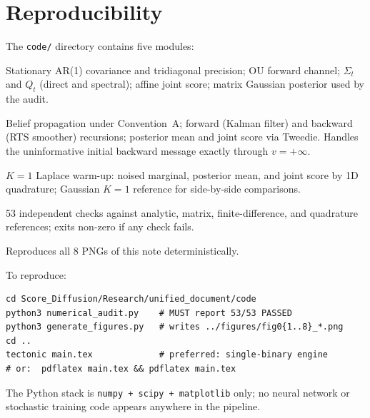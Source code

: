 \documentclass[11pt]{article}
\theoremstyle{definition}
\newcommand{\Sig}{\Sigma}
\begin{document}
\section*{Reproducibility}

The \texttt{code/} directory contains five modules:

\begin{description}[leftmargin=1.4em, style=nextline]
\item[\texttt{ar1\_utils.py}] Stationary AR(1) covariance and tridiagonal
precision; OU forward channel; \(\Sig_t\) and \(Q_t\) (direct and
spectral); affine joint score; matrix Gaussian posterior used by the
audit.
\item[\texttt{bp\_score.py}] Belief propagation under Convention~A;
forward (Kalman filter) and backward (RTS smoother) recursions;
posterior mean and joint score via Tweedie. Handles the
uninformative initial backward message exactly through
\(v = +\infty\).
\item[\texttt{laplace\_score.py}] \(K = 1\) Laplace warm-up: noised
marginal, posterior mean, and joint score by 1D quadrature; Gaussian
\(K = 1\) reference for side-by-side comparisons.
\item[\texttt{numerical\_audit.py}] 53 independent checks against
analytic, matrix, finite-difference, and quadrature references;
exits non-zero if any check fails.
\item[\texttt{generate\_figures.py}] Reproduces all 8 PNGs of this
note deterministically.
\end{description}

To reproduce:
\begin{verbatim}
cd Score_Diffusion/Research/unified_document/code
python3 numerical_audit.py    # MUST report 53/53 PASSED
python3 generate_figures.py   # writes ../figures/fig0{1..8}_*.png
cd ..
tectonic main.tex             # preferred: single-binary engine
# or:  pdflatex main.tex && pdflatex main.tex
\end{verbatim}

The Python stack is \texttt{numpy + scipy + matplotlib} only; no
neural network or stochastic training code appears anywhere in the
pipeline.



\end{document}
